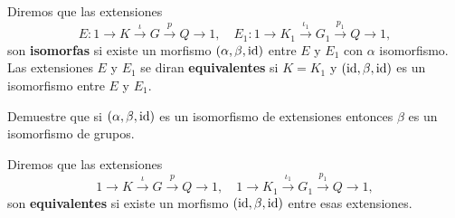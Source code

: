 \begin{definition}
	Diremos que las extensiones 
	\[
	E\colon 1\to K\xrightarrow{\iota}G\xrightarrow{p} Q\to1,
	\quad
	E_1\colon 1\to K_1\xrightarrow{\iota_1}G_1\xrightarrow{p_1} Q\to1,
	\]
	son \textbf{isomorfas} si existe un morfismo $(\alpha,\beta,\operatorname{id})$ entre $E$
	y $E_1$ con $\alpha$ isomorfismo. Las extensiones $E$ y $E_1$ se diran
	\textbf{equivalentes} si $K=K_1$ y $(\operatorname{id},\beta,\operatorname{id})$ es un isomorfismo
	entre $E$ y $E_1$.
\end{definition}

\begin{exercise}
\label{xca:extensiones}
	Demuestre que si $(\alpha,\beta,\operatorname{id})$ es un isomorfismo de extensiones
	entonces $\beta$ es un isomorfismo de grupos.
\end{exercise}

\begin{definition}
	Diremos que las extensiones 
	\[
	1\to K\xrightarrow{\iota}G\xrightarrow{p} Q\to1,
	\quad
	1\to K_1\xrightarrow{\iota_1}G_1\xrightarrow{p_1} Q\to1,
	\]
	son \textbf{equivalentes} si existe un morfismo 
	$(\operatorname{id},\beta,\operatorname{id})$ entre esas extensiones. 
\end{definition}

